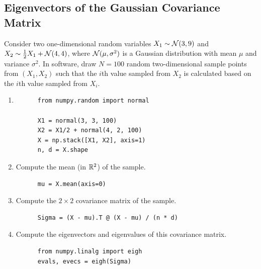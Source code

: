 \subsection{Eigenvectors of the Gaussian Covariance Matrix}
Consider two one-dimensional random variables $X_1 \sim \mathcal{N}(3, 9)$ and $X_2 \sim \frac{1}{2}X_1 + \mathcal{N}(4, 4)$, where $\mathcal{N}(\mu, \sigma^2)$  is a Gaussian distribution with mean $\mu$ and variance $\sigma^2$. In software, draw $N = 100$ random two-dimensional sample points from $(X_1, X_2)$ such that the $i$th value sampled from $X_2$ is calculated based on the $i$th value sampled from $X_i$.
\begin{enumerate}[label=(\alph*)]
  \item
  \begin{mdframed}
    \begin{verbatim}
      from numpy.random import normal

      X1 = normal(3, 3, 100)
      X2 = X1/2 + normal(4, 2, 100)
      X = np.stack([X1, X2], axis=1)
      n, d = X.shape
    \end{verbatim}
  \end{mdframed}
\item Compute the mean (in $\mathbb{R}^2$) of the sample.
  \begin{mdframed}
    \begin{verbatim}
      mu = X.mean(axis=0)
    \end{verbatim}
  \end{mdframed}

\item Compute the $2 \times 2$ covariance matrix of the sample.
  \begin{mdframed}
    \begin{verbatim}
      Sigma = (X - mu).T @ (X - mu) / (n * d)
    \end{verbatim}
  \end{mdframed}

\item Compute the eigenvectors and eigenvalues of this covariance matrix.
  \begin{mdframed}
    \begin{verbatim}
      from numpy.linalg import eigh
      evals, evecs = eigh(Sigma)
    \end{verbatim}
  \end{mdframed}


\end{enumerate}
